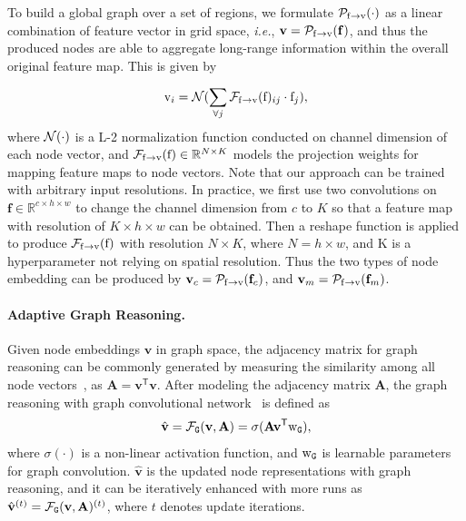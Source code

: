 \documentclass[letterpaper]{article} %
\begin{document}
To build a global graph over a set of regions, we formulate ${\cal P}_{{\mathrm f}\rightarrow {\mathrm v}}(\cdot)$ as a linear combination of feature vector in grid space, {\em i.e.}, ${\mathbf v} = {\cal P}_{{\mathrm f}\rightarrow {\mathrm v}}({\mathbf f})$, and thus the produced nodes are able to aggregate long-range information within the overall original feature map. This is given by

\begin{equation}
{\mathrm v}_i = {\cal N}(\sum_{\forall j}{\cal F}_{{\mathrm f}\rightarrow {\mathrm v}}({\mathrm f})_{ij} \cdot {\mathrm f}_j),
\label{eq1}
\end{equation}
where ${\cal N}(\cdot)$ is a L-2 normalization function conducted on channel dimension of each node vector, and ${\cal F}_{{\mathrm f}\rightarrow {\mathrm v}}({\mathrm f}) \in \mathbb{R}^{N \times K}$ models the projection weights for mapping feature maps to node vectors.
Note that our approach can be trained with arbitrary input resolutions. In practice, we first use two convolutions on ${\mathbf f} \in \mathbb{R}^{c \times h \times w}$ to change the channel dimension from $c$ to $K$ so that a feature map with resolution of $K \times h \times w$ can be obtained. Then a reshape function is applied to produce ${\cal F}_{{\mathrm f}\rightarrow {\mathrm v}}({\mathrm f})$ with resolution $N \times K$, where $N = h \times w$, and K is a hyperparameter not relying on spatial resolution. Thus the two types of node embedding can be produced by ${\mathbf v}_c = {\cal P}_{{\mathrm f}\rightarrow {\mathrm v}}({\mathbf f}_c)$, and ${\mathbf v}_m = {\cal P}_{{\mathrm f}\rightarrow {\mathrm v}}({\mathbf f}_m)$.

\paragraph{Adaptive Graph Reasoning.}

Given node embeddings ${\mathbf v}$ in graph space, the adjacency matrix for graph reasoning can be commonly generated by measuring the similarity among all node vectors~\cite{Li2018BeyondGL}, as ${\mathbf A} = {\mathbf v}^{\mathsf T}{\mathbf v}$. After modeling the adjacency matrix ${\mathbf A}$, the graph reasoning with graph convolutional network~\cite{Kipf2017SemiSupervisedCW} is defined as
\begin{equation}
\hat{\mathbf v} = {\cal F}_{\tt G}({\mathbf v}, {\mathbf A}) = \sigma({\mathbf A} {\mathbf v}^\mathsf{T} {\mathrm w}_{\tt G}),
\end{equation}
where $\sigma(\cdot)$ is a non-linear activation function, and ${\mathrm w}_{\tt G}$ is learnable parameters for graph convolution. $\hat{\mathbf v}$ is the updated node representations with graph reasoning, and it can be iteratively enhanced with more runs as $\hat{\mathbf v}^{(t)} = {\cal F}_{\tt G}({\mathbf v}, {\mathbf A})^{(t)}$, where $t$ denotes update iterations.
\end{document}
